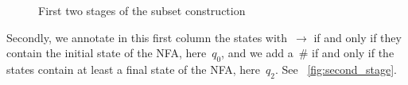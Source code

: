 \begin{figure}
\centering
{}
\qquad
{}
\caption{First two stages of the subset construction}
\end{figure}

Secondly, we annotate in this first column the states
with~\(\rightarrow\) if and only if they contain the initial state of
the NFA, here~\(q_0\), and we add a~\(\#\) if and only if the states
contain at least a final state of the NFA, here~\(q_2\). See
\fig~\vref{fig:second_stage}.

